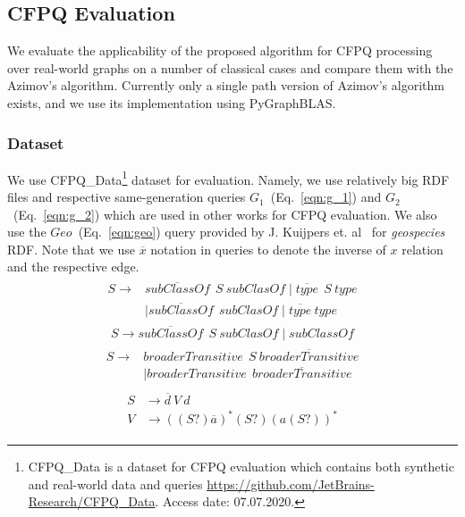 \subsection{CFPQ Evaluation}

We evaluate the applicability of the proposed algorithm for CFPQ processing over real-world graphs on a number of classical cases and compare them with the Azimov's algorithm.
Currently only a single path version of Azimov's algorithm exists, and we use its implementation using PyGraphBLAS.

\subsubsection{Dataset}

We use CFPQ\_Data\footnote{CFPQ\_Data is a dataset for CFPQ evaluation which contains both synthetic and real-world data and queries \url{https://github.com/JetBrains-Research/CFPQ\_Data}. Access date: 07.07.2020.} dataset for evaluation.
Namely, we use relatively big RDF files and respective same-generation queries $G_1$~(Eq.~\ref{eqn:g_1}) and $G_2$~(Eq.~\ref{eqn:g_2}) which are used in other works for CFPQ evaluation.
We also use the $Geo$~(Eq.~\ref{eqn:geo}) query provided by J. Kuijpers et. al~\cite{Kuijpers:2019:ESC:3335783.3335791} for \textit{geospecies} RDF.
Note that we use $\overline{x}$ notation in queries to denote the inverse of $x$ relation and the respective edge.
\begin{align}
\begin{split}
\label{eqn:g_1}
S \to & \overline{\textit{subClassOf}} \ \ S \ \textit{subClasOf} \mid \overline{\textit{type}} \ \ S \ \textit{type}\\   & \mid \overline{\textit{subClassOf}} \ \ \textit{subClasOf} \mid \overline{\textit{type}} \ \textit{type}
\end{split}
\end{align}
\begin{align}
\label{eqn:g_2}
S \to \overline{\textit{subClassOf}} \ \ S \ \textit{subClasOf} \mid \textit{subClassOf}
\end{align}
\begin{align}
\begin{split}
\label{eqn:geo}
S \to & \textit{broaderTransitive} \ \  S \ \overline{\textit{broaderTransitive}} \\
      & \mid \textit{broaderTransitive} \ \  \overline{\textit{broaderTransitive}}
\end{split}
\end{align}
\begin{align}
\begin{split}
\label{eqn:ma}
S & \to \overline{d} \ V \ d \\
V & \to ((S?) \overline{a})^* (S?) (a (S?))^*
\end{split}
\end{align}

